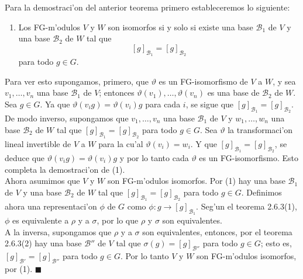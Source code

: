 \documentclass[a4paper,openright,12pt]{report}
\numberwithin{equation}{section} %
\newenvironment{proof}{\noindent{\it Demostracion:}}{\hfill$\blacksquare$} %
\begin{document}
\begin{proof}
Para la demostraci'on del anterior teorema primero estableceremos lo siguiente:
\begin{enumerate}
\item Los FG-m'odulos $V$ y $W$ son isomorfos si y solo si existe una base $\mathscr{B}_{1}$ de $V$ y una base $\mathscr{B}_{2}$ de $W$ tal que
\[
[g]_{\mathscr{B}_{1}}=[g]_{\mathscr{B}_{2}}
\]
para todo $g \in G$.
\end{enumerate}
Para ver esto supongamos, primero, que $\vartheta$ es un FG-isomorfismo de $V$ a $W$, y sea $v_{1}, \ldots ,v_{n}$ una base $\mathscr{B}_{1}$ de $V$; entonces $\vartheta (v_{1}), \ldots ,\vartheta (v_{n})$ es una base de $\mathscr{B}_{2}$ de $W$. Sea $g \in G$. Ya que $\vartheta (v_{i}g)=\vartheta (v_{i})g$ para cada $i$, se sigue que $[g]_{\mathscr{B}_{1}}=[g]_{\mathscr{B}_{2}}$.\\
De modo inverso, supongamos que $v_{1}, \ldots ,v_{n}$ una base $\mathscr{B}_{1}$ de $V$ y $w_{1}, \ldots ,w_{n}$ una base $\mathscr{B}_{2}$ de $W$ tal que $[g]_{\mathscr{B}_{1}}=[g]_{\mathscr{B}_{2}}$ para todo $g \in G$. Sea $\vartheta$ la transformaci'on lineal invertible de $V$ a $W$ para la cu'al $\vartheta (v_{i})=w_{i}$. Y que $[g]_{\mathscr{B}_{1}}=[g]_{\mathscr{B}_{2}}$, se deduce que $\vartheta (v_{i}g)=\vartheta (v_{i})g$ y por lo tanto cada $\vartheta$ es un FG-isomorfismo. Esto completa la demostraci'on de (1).\\
Ahora asumimos que $V$ y $W$ son FG-m'odulos isomorfos. Por (1) hay una base $\mathscr{B}_{1}$ de $V$ y una base $\mathscr{B}_{2}$ de $W$ tal que $[g]_{\mathscr{B}_{1}}=[g]_{\mathscr{B}_{2}}$ para todo $g \in G$. Definimos ahora una representaci'on $\phi$ de $G$ como $\phi : g \rightarrow [g]_{\mathscr{B}_{1}}$. Seg'un el teorema 2.6.3(1), $\phi$ es equivalente a $\rho$ y a $\sigma$, por lo que $\rho$ y $\sigma$ son equivalentes.\\
A la inversa, supongamos que $\rho$ y a $\sigma$ son equivalentes, entonces, por el teorema 2.6.3(2) hay una base $\mathscr{B''}$ de $V$ tal que $\sigma (g) = [g]_{\mathscr{B''}}$ para todo $g \in G$; esto es, $[g]_{\mathscr{B'}}=[g]_{\mathscr{B''}}$  para todo $g \in G$. Por lo tanto $V$ y $W$ son FG-m'odulos isomorfos, por (1).
\end{proof}
\end{document}
